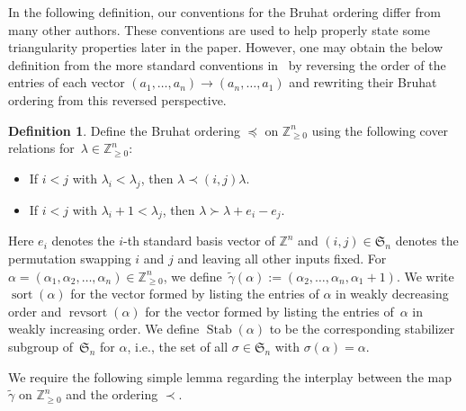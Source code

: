 \documentclass[10pt,a4paper]{amsart}
\numberwithin{equation}{section}
\theoremstyle{definition}
\newtheorem{Definition}[Theorem]{Definition}
\DeclareMathOperator{\sort}{sort}
\DeclareMathOperator{\revsort}{revsort}
\DeclareMathOperator{\Stab}{Stab}
\begin{document}
In the following definition, our conventions for the Bruhat ordering differ from many other authors. These conventions are used to help properly state some triangularity properties later in the paper. However, one may obtain the below definition from the more standard conventions in~\cite[Section~2.1]{haglund2007combinatorial} by reversing the order of the entries of each vector $(a_1,\dots, a_n) \rightarrow (a_n,\dots, a_1)$ and rewriting their Bruhat ordering from this reversed perspective.

\begin{Definition}\label{Bruhat def}
Define the Bruhat ordering $\preceq$ on $\mathbb{Z}_{\geq 0}^n$ using the following cover relations for~${\lambda \in \mathbb{Z}_{\geq 0}^{n}}$:
\begin{itemize}
\itemsep=0pt
 \item If $i<j$ with $\lambda_i < \lambda_j$, then $\lambda \prec (i,j)\lambda$.
 \item If $i<j$ with $\lambda_i + 1< \lambda_j$, then $\lambda \succ \lambda + e_i - e_j$.
\end{itemize}
 Here $e_i$ denotes the $i$-th standard basis vector of $\mathbb{Z}^{n}$ and $(i,j) \in \mathfrak{S}_n$ denotes the permutation swapping $i$ and $j$ and leaving all other inputs fixed. For $\alpha = (\alpha_1,\alpha_2,\dots, \alpha_n) \in \mathbb{Z}^{n}_{\geq 0}$, we define~${\widetilde{\gamma}(\alpha):= (\alpha_2,\dots, \alpha_n, \alpha_1 +1)}$. We write $\sort(\alpha)$ for the vector formed by listing the entries of $\alpha$ in weakly decreasing order and $\revsort(\alpha)$ for the vector formed by listing the entries of~$\alpha$ in weakly increasing order. We define $\Stab(\alpha)$ to be the corresponding stabilizer subgroup of~$\mathfrak{S}_n$ for $\alpha$, i.e., the set of all $\sigma \in \mathfrak{S}_n$ with $\sigma(\alpha) = \alpha$.
\end{Definition}

We require the following simple lemma regarding the interplay between the map $\widetilde{\gamma}$ on $\mathbb{Z}^n_{\geq 0}$ and the ordering $\prec$.
\end{document}

